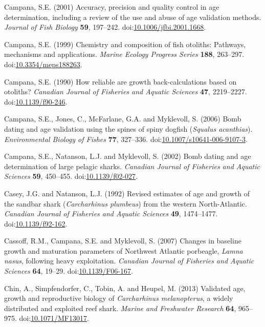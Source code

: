 \documentclass[]{article}
\begin{document}
\hypertarget{ref-campana_accuracy_2001}{}
Campana, S.E. (2001) Accuracy, precision and quality control in age
determination, including a review of the use and abuse of age validation
methods. \emph{Journal of Fish Biology} \textbf{59}, 197--242.
doi:\href{https://doi.org/10.1006/jfbi.2001.1668}{10.1006/jfbi.2001.1668}.

\hypertarget{ref-campana_chemistry_1999}{}
Campana, S.E. (1999) Chemistry and composition of fish otoliths:
Pathways, mechanisms and applications. \emph{Marine Ecology Progress
Series} \textbf{188}, 263--297.
doi:\href{https://doi.org/10.3354/meps188263}{10.3354/meps188263}.

\hypertarget{ref-campana_how_1990}{}
Campana, S.E. (1990) How reliable are growth back-calculations based on
otoliths? \emph{Canadian Journal of Fisheries and Aquatic Sciences}
\textbf{47}, 2219--2227.
doi:\href{https://doi.org/10.1139/f90-246}{10.1139/f90-246}.

\hypertarget{ref-campana_bomb_2006}{}
Campana, S.E., Jones, C., McFarlane, G.A. and Myklevoll, S. (2006) Bomb
dating and age validation using the spines of spiny dogfish
(\emph{Squalus acanthias}). \emph{Environmental Biology of Fishes}
\textbf{77}, 327--336.
doi:\href{https://doi.org/10.1007/s10641-006-9107-3}{10.1007/s10641-006-9107-3}.

\hypertarget{ref-campana_bomb_2002}{}
Campana, S.E., Natanson, L.J. and Myklevoll, S. (2002) Bomb dating and
age determination of large pelagic sharks. \emph{Canadian Journal of
Fisheries and Aquatic Sciences} \textbf{59}, 450--455.
doi:\href{https://doi.org/10.1139/f02-027}{10.1139/f02-027}.

\hypertarget{ref-casey_revised_1992}{}
Casey, J.G. and Natanson, L.J. (1992) Revised estimates of age and
growth of the sandbar shark (\emph{Carcharhinus plumbeus}) from the
western North-Atlantic. \emph{Canadian Journal of Fisheries and Aquatic
Sciences} \textbf{49}, 1474--1477.
doi:\href{https://doi.org/10.1139/f92-162}{10.1139/f92-162}.

\hypertarget{ref-cassoff_changes_2007}{}
Cassoff, R.M., Campana, S.E. and Myklevoll, S. (2007) Changes in
baseline growth and maturation parameters of Northwest Atlantic
porbeagle, \emph{Lamna nasus}, following heavy exploitation.
\emph{Canadian Journal of Fisheries and Aquatic Sciences} \textbf{64},
19--29. doi:\href{https://doi.org/10.1139/F06-167}{10.1139/F06-167}.

\hypertarget{ref-chin_validated_2013}{}
Chin, A., Simpfendorfer, C., Tobin, A. and Heupel, M. (2013) Validated
age, growth and reproductive biology of \emph{Carcharhinus
melanopterus}, a widely distributed and exploited reef shark.
\emph{Marine and Freshwater Research} \textbf{64}, 965--975.
doi:\href{https://doi.org/10.1071/MF13017}{10.1071/MF13017}.
\end{document}
